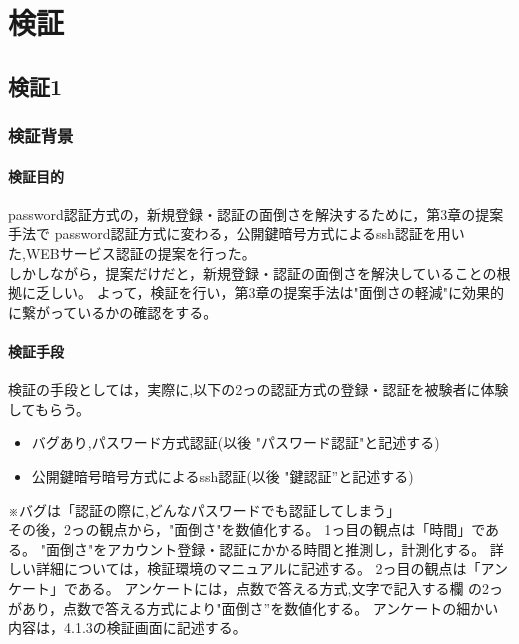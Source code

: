 \chapter{検証}
\label{chap:poordirection}


\section{検証1}

\subsection{検証背景}

\subsubsection{検証目的}

password認証方式の，新規登録・認証の面倒さを解決するために，第3章の提案手法で
password認証方式に変わる，公開鍵暗号方式によるssh認証を用いた,WEBサービス認証の提案を行った。\\
しかしながら，提案だけだと，新規登録・認証の面倒さを解決していることの根拠に乏しい。
よって，検証を行い，第3章の提案手法は"面倒さの軽減"に効果的に繋がっているかの確認をする。


\subsubsection{検証手段}

検証の手段としては，実際に,以下の2っの認証方式の登録・認証を被験者に体験してもらう。

\begin{itemize}
  \item バグあり,パスワード方式認証(以後 "パスワード認証"と記述する)
  \item 公開鍵暗号暗号方式によるssh認証(以後 "鍵認証”と記述する)
\end{itemize}

※バグは「認証の際に,どんなパスワードでも認証してしまう」\\
その後，2っの観点から，"面倒さ"を数値化する。
1っ目の観点は「時間」である。
"面倒さ"をアカウント登録・認証にかかる時間と推測し，計測化する。
詳しい詳細については，検証環境のマニュアルに記述する。
2っ目の観点は「アンケート」である。
アンケートには，点数で答える方式,文字で記入する欄 の2っがあり，点数で答える方式により"面倒さ”を数値化する。
アンケートの細かい内容は，4.1.3の検証画面に記述する。

